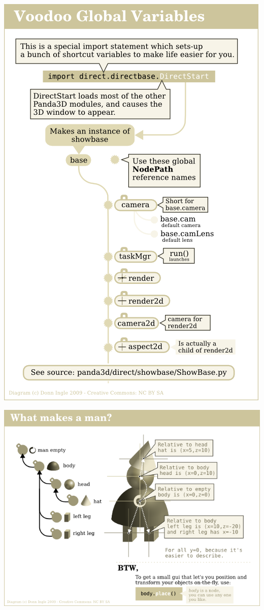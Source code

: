 \documentclass[a4paper,10pt]{book}
\begin{document}
\begin{center}
\includegraphics[scale=0.8]{GlobalVars.png} 
\end{center}

\begin{center}
\includegraphics[scale=0.8]{Man.png} 
\end{center}
\end{document}
